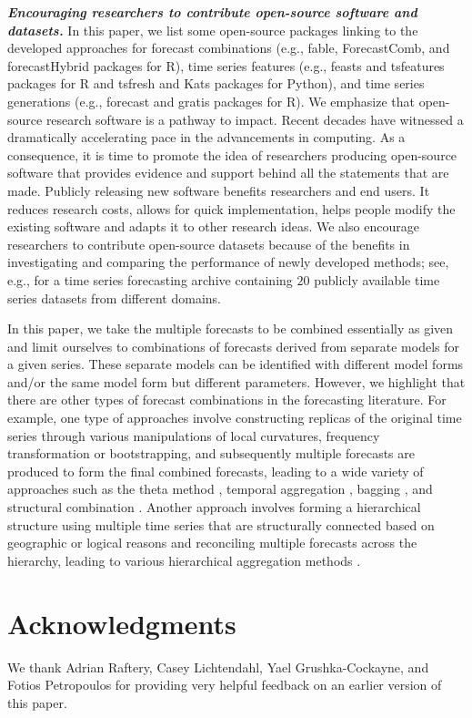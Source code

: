\documentclass[a4paper,11pt]{article}
\newcommand{\pkg}[1]{{\normalfont\fontseries{b}\selectfont #1}}
\let\proglang=\textsf
\begin{document}
\textbf{\textit{Encouraging researchers to contribute open-source software and datasets.}} In this paper, we list some open-source packages linking to the developed approaches for forecast combinations (e.g., \pkg{fable}, \pkg{ForecastComb}, and \pkg{forecastHybrid} packages for \proglang{R}), time series features (e.g., \pkg{feasts} and \pkg{tsfeatures} packages for \proglang{R} and \pkg{tsfresh} and \pkg{Kats} packages for \proglang{Python}), and time series generations (e.g., \pkg{forecast} and \pkg{gratis} packages for \proglang{R}). We emphasize that open-source research software is a pathway to impact. Recent decades have witnessed a dramatically accelerating pace in the advancements in computing. As a consequence, it is time to promote the idea of researchers producing open-source software that provides evidence and support behind all the statements that are made. Publicly releasing new software benefits researchers and end users. It reduces research costs, allows for quick implementation, helps people modify the existing software and adapts it to other research ideas. We also encourage researchers to contribute open-source datasets because of the benefits in investigating and comparing the performance of newly developed methods; see, e.g., \citet{Godahewa2021-mo,Godahewa2021-wb} for a time series forecasting archive containing $20$ publicly available time series datasets from different domains.

In this paper, we take the multiple forecasts to be combined essentially as given and limit ourselves to combinations of forecasts derived from separate models for a given series. These separate models can be identified with different model forms and/or the same model form but different parameters. However, we highlight that there are other types of forecast combinations in the forecasting literature. For example, one type of approaches involve constructing replicas of the original time series through various manipulations of local curvatures, frequency transformation or bootstrapping, and subsequently multiple forecasts are produced to form the final combined forecasts, leading to a wide variety of approaches such as the theta method \citep{Assimakopoulos2000-cc}, temporal aggregation \citep[e.g.,][]{Kourentzes2014-wz,Kourentzes2016-qq,Kourentzes2017-xe}, bagging \citep[e.g.,][]{Bergmeir2016-ae,Petropoulos2018-fw}, and structural combination \citep[e.g.,][]{Rendon-Sanchez2019-qm}. Another approach involves forming a hierarchical structure using multiple time series that are structurally connected based on geographic or logical reasons and reconciling multiple forecasts across the hierarchy, leading to various hierarchical aggregation methods \citep[e.g.,][]{Hyndman2011-sd,Wickramasuriya2019-fc,Taieb2021-tc,Hollyman2021-tn}.

\section*{Acknowledgments}

We thank Adrian Raftery, Casey Lichtendahl, Yael Grushka-Cockayne, and Fotios Petropoulos for providing very helpful feedback on an earlier version of this paper.

\newpage
\printbibliography
\end{document}
